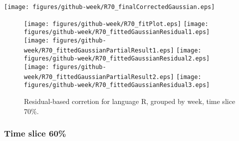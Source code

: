 \begin{center}
{\texttt{[image: figures/github-week/R70\_finalCorrectedGaussian.eps]}}
\end{center}

\FloatBarrier

\begin{figure}[t]
\centering
{}
{\texttt{[image: figures/github-week/R70\_fitPlot.eps]}}
{\texttt{[image: figures/github-week/R70\_fittedGaussianResidual1.eps]}}
{\texttt{[image: figures/github-week/R70\_fittedGaussianPartialResult1.eps]}}
{\texttt{[image: figures/github-week/R70\_fittedGaussianResidual2.eps]}}
{\texttt{[image: figures/github-week/R70\_fittedGaussianPartialResult2.eps]}}
{\texttt{[image: figures/github-week/R70\_fittedGaussianResidual3.eps]}}
\caption{Residual-based corretion for language R, grouped by week, time slice 70\%.}
\end{figure}


\FloatBarrier


\subsubsection{Time slice 60\%}

